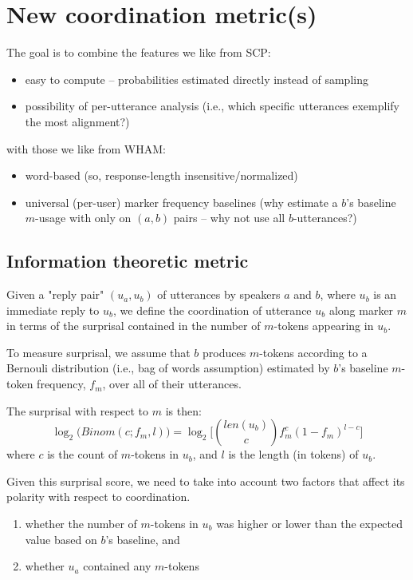 \documentclass[12pt]{scrartcl}
\begin{document}
\section{New coordination metric(s)}

The goal is to combine the features we like from SCP:
\begin{itemize}
	\item easy to compute -- probabilities estimated directly instead of sampling
  \item possibility of per-utterance analysis (i.e., which specific utterances exemplify the most alignment?)
\end{itemize}
with those we like from WHAM:
\begin{itemize}
	\item word-based (so, response-length insensitive/normalized)
  \item universal (per-user) marker frequency baselines (why estimate a $b$'s baseline $m$-usage with only on $(a,b)$ pairs -- why not use all $b$-utterances?)
\end{itemize}

\subsection{Information theoretic metric}

Given a "reply pair" $(u_a, u_b)$ of utterances by speakers $a$ and $b$, where $u_b$ is an immediate reply to $u_b$, we define the coordination of utterance $u_b$ along marker $m$ in terms of the surprisal contained in the number of $m$-tokens appearing in $u_b$.

To measure surprisal, we assume that $b$ produces $m$-tokens according to a Bernouli distribution (i.e., bag of words assumption) estimated by $b$'s baseline $m$-token frequency, $f_m$, over all of their utterances.

The surprisal with respect to $m$ is then:
\[
	\log_2\big(Binom(c;f_m,l)\big) = \log_2\Big[\binom{len(u_b)}{c} f^c_m(1-f_m)^{l-c}\Big]
\]
where $c$ is the count of $m$-tokens in $u_b$, and $l$ is the length (in tokens) of $u_b$.

Given this surprisal score, we need to take into account two factors that affect its polarity with respect to coordination.
\begin{enumerate}
	\item whether the number of $m$-tokens in $u_b$ was higher or lower than the expected value based on $b$'s baseline, and
	\item whether $u_a$ contained any $m$-tokens
\end{enumerate}
\end{document}
